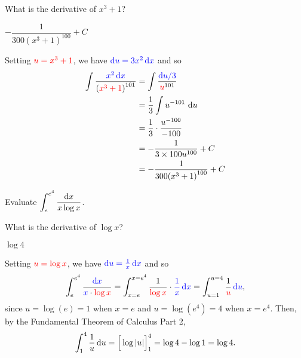 \begin{hint}
What is the derivative of $x^3+1$?
\end{hint}

\begin{answer}
$-\dfrac{1}{300{(x^3+1)}^{100}} + C$
\end{answer}

\begin{solution}
Setting $\textcolor{red}{u=x^3+1}$, we have $\textcolor{blue}{\mathrm{d}u = 3x^2\,\mathrm{d}x}$ and so
\begin{align*}
 \int  \frac{\textcolor{blue}{x^2\,\mathrm{d}x}}{{(\textcolor{red}{x^3+1})}^{101}}
  &= \int \frac{\textcolor{blue}{\mathrm{d}u/3}}{\textcolor{red}{u}^{101}}\\
  &=\frac{1}{3}\int u^{-101}\ \mathrm{d}u\\
&=\frac{1}{3}\cdot\dfrac{u^{-100}}{-100}\\
  &= -\frac{1}{3\times 100 u^{100}} + C\\
  &=-\frac{1}{300{(x^3+1)}^{100}} + C
\end{align*}
\end{solution}



\begin{Mquestion}[2016Q2]
Evaluate $\displaystyle \int_{e}^{e^4} \frac{\mathrm{d}x}{x\log x}$.
\end{Mquestion}

\begin{hint}
What is the derivative of $\log x$?
\end{hint}

\begin{answer}
$\log 4$
\end{answer}

\begin{solution}
Setting $\textcolor{red}{u=\log x}$, we have $\textcolor{blue}{\mathrm{d}u = \frac{1}{x}\,\mathrm{d}x}$ and so
\begin{equation*}
 \int_{e}^{e^4} \frac{\textcolor{blue}{\mathrm{d}x}}{\textcolor{blue}x\cdot\textcolor{red}{\log x}}
  = \int_{x=e}^{x=e^4} \frac1{\textcolor{red}{\log x}} \cdot \textcolor{blue}{\frac{1}{x}\,\mathrm{d}x }
  = \int_{u=1}^{u=4} \frac{1}{\textcolor{red}u}\,\textcolor{blue}{ \mathrm{d}u},
\end{equation*}
since $u=\log(e)=1$ when $x=e$ and $u=\log(e^4)=4$ when $x=e^4$.
Then, by the Fundamental Theorem of Calculus Part 2,
\begin{equation*}
\int_{1}^{4} \frac{1}{u}\, \mathrm{d}u
   = \Big[\log |u| \Big]_{1}^{4} = \log 4 - \log 1 = \log 4.
\end{equation*}
\end{solution}


